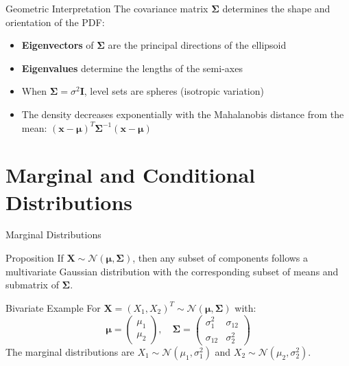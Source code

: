 \documentclass{beamer}
\begin{document}
\begin{frame}{Geometric Interpretation}
  The covariance matrix $\boldsymbol{\Sigma}$ determines the shape and orientation of the PDF:
  
  \begin{itemize}
    \item \textbf{Eigenvectors} of $\boldsymbol{\Sigma}$ are the principal directions of the ellipsoid
    \item \textbf{Eigenvalues} determine the lengths of the semi-axes
    \item When $\boldsymbol{\Sigma} = \sigma^2 \mathbf{I}$, level sets are spheres (isotropic variation)
    \item The density decreases exponentially with the Mahalanobis distance from the mean: $(\mathbf{x}-\boldsymbol{\mu})^T \boldsymbol{\Sigma}^{-1} (\mathbf{x}-\boldsymbol{\mu})$
  \end{itemize}
\end{frame}

\section{Marginal and Conditional Distributions}

\begin{frame}{Marginal Distributions}
  \begin{block}{Proposition}
    If $\mathbf{X} \sim \mathcal{N}(\boldsymbol{\mu}, \boldsymbol{\Sigma})$, then any subset of components follows a multivariate Gaussian distribution with the corresponding subset of means and submatrix of $\boldsymbol{\Sigma}$.
  \end{block}
  
  \begin{block}{Bivariate Example}
    For $\mathbf{X} = (X_1, X_2)^T \sim \mathcal{N}(\boldsymbol{\mu}, \boldsymbol{\Sigma})$ with:
    \[
    \boldsymbol{\mu} = \begin{pmatrix} \mu_1 \\ \mu_2 \end{pmatrix}, \quad
    \boldsymbol{\Sigma} = \begin{pmatrix} \sigma_1^2 & \sigma_{12} \\ \sigma_{12} & \sigma_2^2 \end{pmatrix}
    \]
    The marginal distributions are $X_1 \sim \mathcal{N}(\mu_1, \sigma_1^2)$ and $X_2 \sim \mathcal{N}(\mu_2, \sigma_2^2)$.
  \end{block}
\end{frame}
\end{document}
